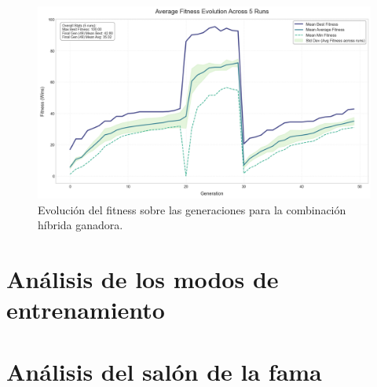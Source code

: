 \begin{figure}[H]
	\centering
	\includegraphics[width=1.0\textwidth]{img/fitness_evolution_424.png}
	\caption{Evolución del fitness sobre las generaciones para la combinación híbrida ganadora.}
	\label{fig:fitness_evolution_424}
\end{figure}

\section{Análisis de los modos de entrenamiento} \label{sec:analisis_modos_entrenamiento}


\section{Análisis del salón de la fama} \label{sec:analisis_salon_fama}







